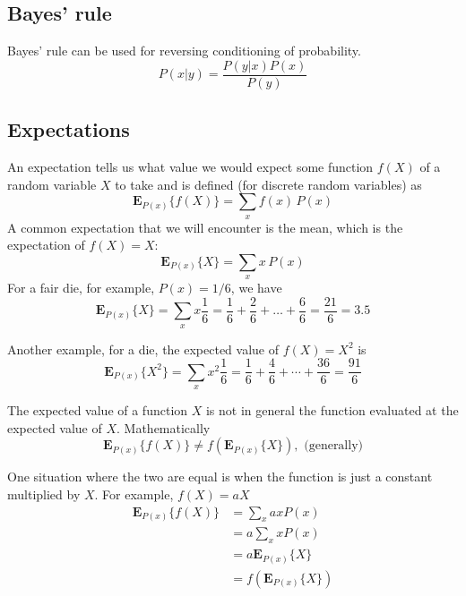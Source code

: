\subsection{Bayes' rule}

Bayes' rule can be used for reversing conditioning of probability.
\begin{equation}
P(x|y) = \frac{P(y|x) P(x)}{P(y)}
\end{equation}

\subsection{Expectations}

An expectation tells us what value we would expect some function $f(X)$ of a random variable
$X$ to take and is defined (for discrete random variables) as
\begin{equation}
\mathbf{E}_{P(x)}\{f(X)\} = \sum_{x} f(x)\,P(x)
\end{equation}
A common expectation that we will encounter is the mean, which is the expectation
of $f(X) = X$:
\begin{equation}
\mathbf{E}_{P(x)}\{X\} = \sum_{x} x\,P(x)
\end{equation}
For a fair die, for example, $P(x)=1/6$, we have
\begin{equation}
\mathbf{E}_{P(x)}\{X\} = \sum_{x} x \frac{1}{6} = \frac{1}{6} +
\frac{2}{6} + \ldots + \frac{6}{6} = \frac{21}{6} = 3.5
\end{equation}

Another example, for a die, the expected value of $f(X)=X^2$ is
\begin{equation}
\mathbf{E}_{P(x)}\{X^2\} = \sum_{x} x^2\frac{1}{6} =
\frac{1}{6} + \frac{4}{6} + \cdots + \frac{36}{6} = \frac{91}{6}
\end{equation}

The expected value of a function $X$ is not in general the function evaluated
at the expected value of $X$. Mathematically
\begin{equation}
\mathbf{E}_{P(x)}\{f(X)\} \neq f(\mathbf{E}_{P(x)}\{X\}),\,\,\text{(generally)}
\end{equation}

One situation where the two are equal is when the function is just a constant multiplied
by $X$. For example, $f(X) = aX$
\begin{align*}
\mathbf{E}_{P(x)}\{f(X)\} & = \sum_{x} ax P(x) \\
& = a\sum_{x} x P(x) \\
& = a\mathbf{E}_{P(x)}\{X\} \\
& = f\left(\mathbf{E}_{P(x)}\{X\}\right)
\end{align*}

